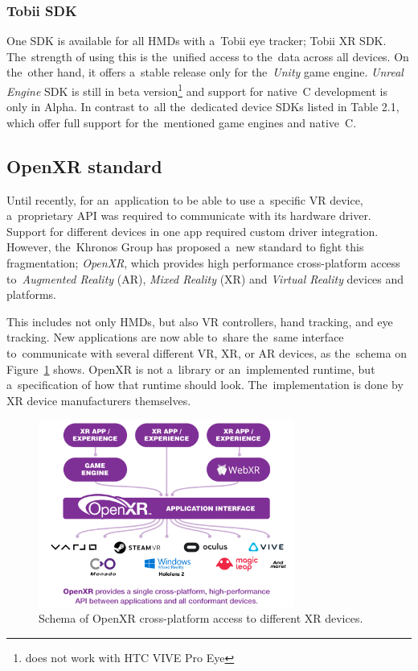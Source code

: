 \subsubsection*{Tobii SDK}
One SDK is available for all HMDs with a~Tobii eye tracker; Tobii XR SDK. The~strength of using this is the~unified access to the~data across all devices. On the~other hand, it offers a~stable release only for the~\emph{Unity} game engine. \emph{Unreal Engine} SDK is still in beta version\footnote{does not work with HTC VIVE Pro Eye} and support for native~C development is only in Alpha. In contrast to~all the~dedicated device SDKs listed in Table 2.1, which offer full support for the~mentioned game engines and native~C.~\cite{tobii-xrsdk} 

\pagebreak{}

\subsection{OpenXR standard}
Until recently, for an~application to be able to use a~specific VR device, a~proprietary API was required to communicate with its hardware driver. Support for different devices in one app required custom driver integration. However, the~Khronos Group has proposed a~new standard to fight this fragmentation; \emph{OpenXR}, which provides high performance cross-platform access to~\emph{Augmented Reality} (AR), \emph{Mixed Reality} (XR) and \emph{Virtual Reality} devices and platforms. 

This includes not only HMDs, but also VR controllers, hand tracking, and eye tracking. New applications are now able to~share the~same interface to~communicate with several different VR, XR, or AR devices, as the~schema on Figure~\ref{fig:openxr-schema} shows. OpenXR is not a~library or an~implemented runtime, but a~specification of how that runtime should look. The~implementation is done by XR device manufacturers themselves.~\cite{openxr-overview, openxr-presentation}

\begin{figure}[!ht]\centering
    \includegraphics[width=0.75\textwidth]{img/openXR.png}
    \caption[Schema of OpenXR cross-platform access to different XR devices.]{Schema of OpenXR cross-platform access to different XR devices.~\cite{openxr-access-image}}
    \label{fig:openxr-schema}
\end{figure}

